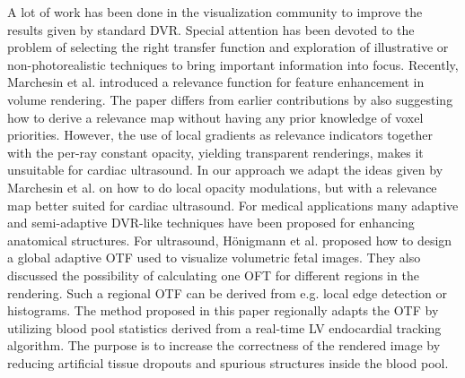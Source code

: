 A lot of work has been done in the visualization community to improve the results given by standard DVR. Special attention has been devoted to the problem of selecting the right transfer function\cite{Kindlmann1998, sereda2006visualization, wesarg2d, Woodring2009, Haidacher2010, correa2010visibility, Wang2011} and exploration of illustrative or non-photorealistic techniques to bring important information into focus\cite{viola2005, bruckner2006illustrative, Rezk-Salama2006, Malik2007, Bruckner2009}. Recently, Marchesin et al. \cite{marchesin2010} introduced a relevance function for feature enhancement in volume rendering. The paper differs from earlier contributions by also suggesting how to derive a relevance map without having any prior knowledge of voxel priorities. However, the use of local gradients as relevance indicators together with the per-ray constant opacity, yielding transparent renderings, makes it unsuitable for cardiac ultrasound. In our approach we adapt the ideas given by Marchesin et al. on how to do local opacity modulations, but with a relevance map better suited for cardiac ultrasound. For medical applications many adaptive and semi-adaptive DVR-like techniques have been proposed for enhancing anatomical structures\cite{borland2006volumetric, lindholm2010, 10.1109/TVCG.2006.100, Zhang2008}. For ultrasound, H\"{o}nigmann et al.\cite{Honigmann2003} proposed how to design a global adaptive OTF used to visualize volumetric fetal images. They also discussed the possibility of calculating one OFT for different regions in the rendering. Such a regional OTF can be derived from e.g. local edge detection or histograms. The method proposed in this paper regionally adapts the OTF by utilizing blood pool statistics derived from a real-time LV endocardial tracking algorithm\cite{orderud2006}. The purpose is to increase the correctness of the rendered image by reducing artificial tissue dropouts and spurious structures inside the blood pool.



